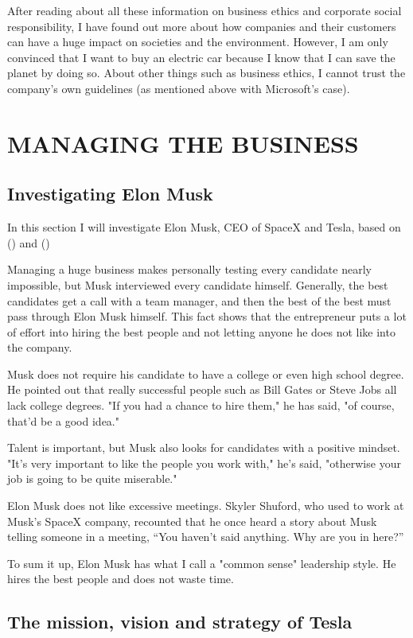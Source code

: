 \documentclass[12pt]{article}
\begin{document}
After reading about all these information on business ethics and corporate social responsibility, I have found out more about how companies and their customers can have a huge impact on societies and the environment. However, I am only convinced that I want to buy an electric car because I know that I can save the planet by doing so. About other things such as business ethics, I cannot trust the company's own guidelines (as mentioned above with Microsoft's case).

\section{MANAGING THE BUSINESS}

\subsection{Investigating Elon Musk}

In this section I will investigate Elon Musk, CEO of SpaceX and Tesla, based on (\cite{ry17}) and (\cite{to17})

Managing a huge business makes personally testing every candidate nearly impossible, but Musk interviewed every candidate himself. Generally, the best candidates get a call with a team manager, and then the best of the best must pass through Elon Musk himself. This fact shows that the entrepreneur puts a lot of effort into hiring the best people and not letting anyone he does not like into the company.

Musk does not require his candidate to have a college or even high school degree. He pointed out that really successful people such as Bill Gates or Steve Jobs all lack college degrees. "If you had a chance to hire them," he has said, "of course, that'd be a good idea."

Talent is important, but Musk also looks for candidates with a positive mindset. "It's very important to like the people you work with," he's said, "otherwise your job is going to be quite miserable."

Elon Musk does not like excessive meetings. Skyler Shuford, who used to work at Musk’s SpaceX company, recounted that he once heard a story about Musk telling someone in a meeting, “You haven’t said anything. Why are you in here?”

To sum it up, Elon Musk has what I call a "common sense" leadership style. He hires the best people and does not waste time.

\subsection{The mission, vision and strategy of Tesla}
\end{document}
